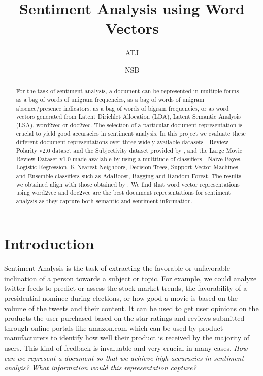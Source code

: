 \documentclass[11pt, oneside]{article}
\title{Sentiment Analysis using Word Vectors}
\author{ATJ}
\author{NSB}
\affil{University of Massachussets, Amherst}
\date{}
\begin{document}
\maketitle
{}
\newpage
{}
\begin{abstract}
For the task of sentiment analysis, a document can be represented in multiple forms - as a bag of words of unigram frequencies, as a bag of words of unigram absence/presence indicators, as a bag of words of bigram frequencies, or as word vectors generated from Latent Dirichlet Allocation (LDA), Latent Semantic Analysis (LSA), word2vec or doc2vec. The selection of a particular document representation is crucial to yield good accuracies in sentiment analysis. In this project we evaluate these different document representations over three widely available datasets - Review Polarity v2.0 dataset and the Subjectivity dataset provided by \cite{pang2004sentimental}, and the Large Movie Review Dataset v1.0 made available by \cite{maas2011learning} using a multitude of classifiers - Naïve Bayes, Logistic Regression, K-Nearest Neighbors, Decision Trees, Support Vector Machines and Ensemble classifiers such as AdaBoost, Bagging and Random Forest. The results we obtained align with those obtained by \cite{maas2011learning}. We find that word vector representations using word2vec and doc2vec are the best document representations for sentiment analysis as they capture both semantic and sentiment information. 
\end{abstract}
\section{Introduction}
\paragraph{}
Sentiment Analysis is the task of extracting the favorable or unfavorable inclination of a person towards a subject or topic. For example, we could analyze twitter feeds to predict or assess the stock market trends, the favorability of a presidential nominee during elections, or how good a movie is based on the volume of the tweets and their content. It can be used to get user opinions on the products the user purchased based on the star ratings and reviews submitted through online portals like amazon.com which can be used by product manufacturers to identify how well their product is received by the majority of users. This kind of feedback is invaluable and very crucial in many cases. \textit{How can we represent a document so that we achieve high accuracies in sentiment analyis? What information would this representation capture?}
\end{document}
